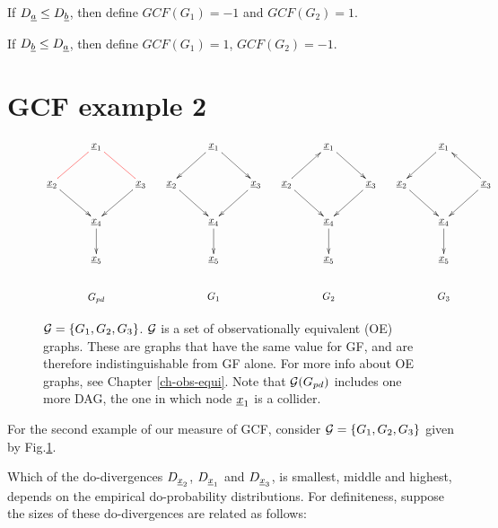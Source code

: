 If $D_{\underline{a}}\leq  D_{\underline{b}}$, then define
$GCF(G_1)=-1$ and $GCF(G_2)=1$.

If $D_{\underline{b}}\leq  D_{\underline{a}}$, then define
$GCF(G_1)=1$, $GCF(G_2)=-1$.



\section{GCF example 2}

\begin{figure}[h!]
$$
\xymatrix{
&\rvx_1
\ar@[red]@{-}[dl]\ar@[red]@{-}[dr]
\\
\rvx_2\ar[dr]
&&\rvx_3\ar[dl]
\\
&\rvx_4\ar[d]
\\
&\rvx_5
\\
&G_{pd}
}
\;\;\;\;\;
\xymatrix{
&\rvx_1
\ar[dl]
\ar[dr]
\\
\rvx_2\ar[dr]
&&\rvx_3\ar[dl]
\\
&\rvx_4\ar[d]
\\
&\rvx_5
\\
&G_1
}
\;\;\;\;\;
\xymatrix{
&\rvx_1
\ar[dr]
\\
\rvx_2\ar[dr]\ar[ur]
&&\rvx_3\ar[dl]
\\
&\rvx_4\ar[d]
\\
&\rvx_5
\\
&G_2
}
\;\;\;\;\;
\xymatrix{
&\rvx_1
\ar[dl]
\\
\rvx_2\ar[dr]
&&\rvx_3\ar[dl]\ar[ul]
\\
&\rvx_4\ar[d]
\\
&\rvx_5
\\
&G_3
}
$$
\caption{${\cal G}=\{G_1, G_2, G_3\}$.
${\cal G}$ is a set of observationally
equivalent (OE) graphs. 
These are graphs that have the
same value for GF, and
are therefore indistinguishable
from GF alone. For more info about 
OE graphs, see Chapter
\ref{ch-obs-equi}.
Note that ${\cal G}(G_{pd})$
includes one more DAG,
the one in which node ${\underline{x}}_1$
is a collider.}
\label{fig-ob-eq-2}
\end{figure}

For the second example of
our measure of GCF,
consider 
${\cal G}=\{G_1, G_2, G_3\}$
given by Fig.\ref{fig-ob-eq-2}.

Which of the do-divergences
$D_{{\underline{x}}_2}$, $ D_{{\underline{x}}_1}$ and $D_{{\underline{x}}_3}$,
is smallest, middle and
highest, depends on the empirical
do-probability distributions.
For definiteness,
suppose the
sizes of these do-divergences
are related as follows:



